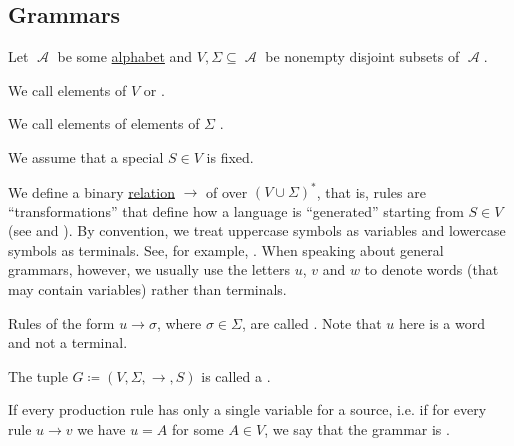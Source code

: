 \subsection{Grammars}\label{subsec:grammars}

\begin{definition}\label{def:grammar}\mcite\cite[def. 2.2]{Sipser2013}
  Let \( \mscrA \) be some \hyperref[def:language/alphabet]{alphabet} and \( V, \Sigma \subseteq \mscrA \) be nonempty disjoint subsets of \( \mscrA \).

  \begin{thmenum}
     We call elements of \( V \)  or .

     We call elements of elements of \( \Sigma \) .

     We assume that a special  \( S \in V \) is fixed.

     We define a binary \hyperref[def:relation]{relation} \( \to \) of  over \( (V \cup \Sigma)^* \), that is, rules are \enquote{transformations} that define how a language is \enquote{generated} starting from \( S \in V \) (see  and ). By convention, we treat uppercase symbols as variables and lowercase symbols as terminals. See, for example, . When speaking about general grammars, however, we usually use the letters \( u \), \( v \) and \( w \) to denote words (that may contain variables) rather than terminals.

     Rules of the form \( u \to \sigma \), where \( \sigma \in \Sigma \), are called . Note that \( u \) here is a word and not a terminal.

     The tuple \( G \coloneqq (V, \Sigma, \to, S) \) is called a .

     If every production rule has only a single variable for a source, i.e. if for every rule \( u \to v \) we have \( u = A \) for some \( A \in V \), we say that the grammar is .
  \end{thmenum}
\end{definition}


